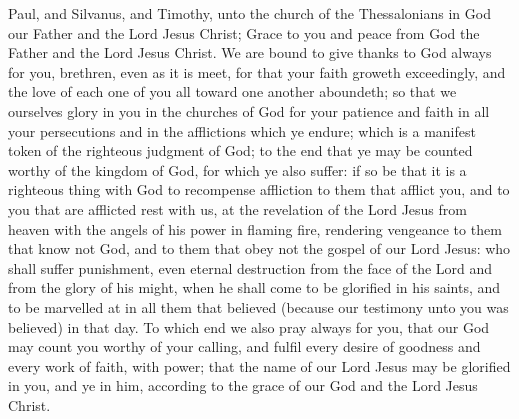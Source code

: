 


Paul, and Silvanus, and Timothy, unto the church of the Thessalonians in God our Father and the Lord Jesus Christ; Grace to you and peace from God the Father and the Lord Jesus Christ.  We are bound to give thanks to God always for you, brethren, even as it is meet, for that your faith groweth exceedingly, and the love of each one of you all toward one another aboundeth; so that we ourselves glory in you in the churches of God for your patience and faith in all your persecutions and in the afflictions which ye endure; which is a manifest token of the righteous judgment of God; to the end that ye may be counted worthy of the kingdom of God, for which ye also suffer: if so be that it is a righteous thing with God to recompense affliction to them that afflict you, and to you that are afflicted rest with us, at the revelation of the Lord Jesus from heaven with the angels of his power in flaming fire, rendering vengeance to them that know not God, and to them that obey not the gospel of our Lord Jesus: who shall suffer punishment, even eternal destruction from the face of the Lord and from the glory of his might, when he shall come to be glorified in his saints, and to be marvelled at in all them that believed (because our testimony unto you was believed) in that day. To which end we also pray always for you, that our God may count you worthy of your calling, and fulfil every desire of goodness and every work of faith, with power; that the name of our Lord Jesus may be glorified in you, and ye in him, according to the grace of our God and the Lord Jesus Christ. 

